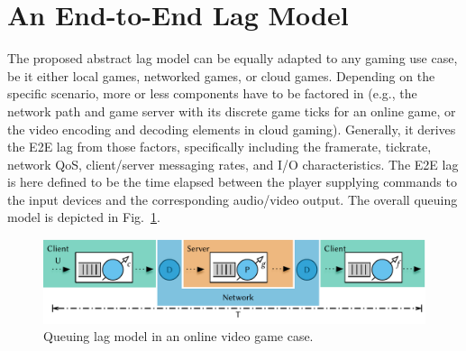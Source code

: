 \section{An End-to-End Lag Model}
\label{sec:model}

The proposed abstract lag model can be equally adapted to any gaming use case, be it either local games, networked games, or cloud games. Depending on the specific scenario, more or less components have to be factored in (e.g., the network path and game server with its discrete game ticks for an online game, or the video encoding and decoding elements in cloud gaming). Generally, it derives the \gls{E2E} lag from those factors, specifically including the framerate, tickrate, network \gls{QoS}, client/server messaging rates, and I/O characteristics. The \gls{E2E} lag is here defined to be the time elapsed between the player supplying commands to the input devices and the corresponding audio/video output. The overall queuing model is depicted in Fig.~\ref{fig:queuing-model}.

\begin{figure}[!t]
	\centering
	\includegraphics[width=1.0\columnwidth]{../../models/e2e-lag-model.pdf}
	\caption{Queuing lag model in an online video game case.}
\label{fig:queuing-model}
\end{figure}


